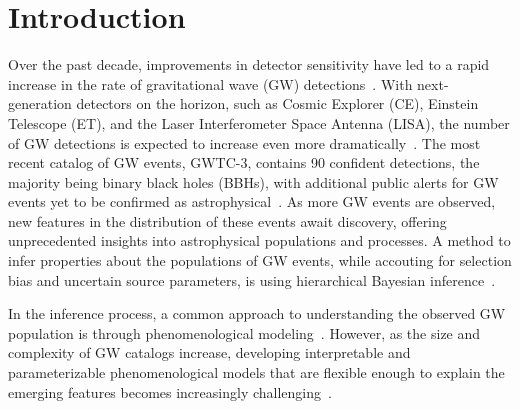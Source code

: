 \documentclass[twocolumn]{aastex631}
\begin{document}
\title{}





\begin{abstract}
    We're using GPs to build surrogate likelihoods for COMPAS star formation parameters, given the LVK observed dataset.
\end{abstract}




\section{Introduction}
\label{sec:intro}

Over the past decade, improvements in detector sensitivity have led to a rapid increase in the rate of gravitational wave (GW) detections~\citep{GWTC1, GWTC2, GWTC3}. 
With next-generation detectors on the horizon, such as Cosmic Explorer (CE), Einstein Telescope (ET), and the Laser Interferometer Space Antenna (LISA), the number of GW detections is expected to increase even more dramatically~\citep{ET_design_report, ET_science_case, CE_horizon_study, LISA_science_case, LISA_red_book}. 
The most recent catalog of GW events, GWTC-3, contains 90 confident detections, the majority being binary black holes (BBHs), with additional public alerts for GW events yet to be confirmed as astrophysical~\citep{GWTC3, GraceDB2024}. 
As more GW events are observed, new features in the distribution of these events await discovery, offering unprecedented insights into astrophysical populations and processes.
A method to infer properties about the populations of GW events, while accouting for selection bias and uncertain source parameters, is using hierarchical Bayesian inference~\citep{Mandel:2019:MNRAS, Vitale:2022:hgwa}.

In the inference process, a common approach to understanding the observed GW population is through phenomenological modeling~\citep{Talbot:2017:PhRvD, Talbot:2018:ApJ, gwpopulation, Wysocki:2019:PhRvD, Fishbach:2018:ApJL, GWTC2PopInf, GWTC3PopInf, Mastrogiovanni:2023:arXiv}. 
However, as the size and complexity of GW catalogs increase, developing interpretable and parameterizable phenomenological models that are flexible enough to explain the emerging features becomes increasingly challenging~\citep{Golomb:2023:PhRvD}.
\end{document}
